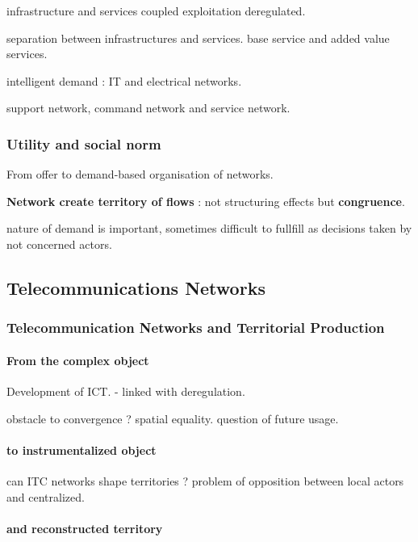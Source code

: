 infrastructure and services coupled exploitation deregulated.

separation between infrastructures and services. base service and added value services.

intelligent demand : IT and electrical networks.

support network, command network and service network.

\subsubsection*{Utility and social norm} 

From offer to demand-based organisation of networks.

\textbf{Network create territory of flows} : not structuring effects but \textbf{congruence}.

nature of demand is important, sometimes difficult to fullfill as decisions taken by not concerned actors.


\subsection{Telecommunications Networks}

\subsubsection*{Telecommunication Networks and Territorial Production}

\paragraph{From the complex object}

Development of ICT. - linked with deregulation.

obstacle to convergence ? spatial equality. question of future usage.

\paragraph{to instrumentalized object}

can ITC networks shape territories ? problem of opposition between local actors and centralized.

\paragraph{and reconstructed territory}

